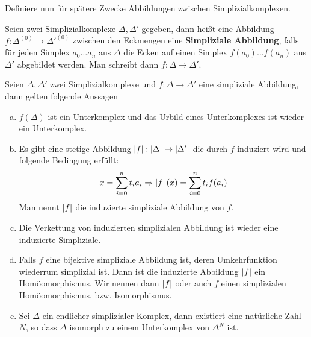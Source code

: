 Definiere nun für spätere Zwecke Abbildungen zwischen Simplizialkomplexen.

\begin{Def} 
  Seien zwei Simplizialkomplexe $\Delta, \Delta'$ gegeben, dann heißt
  eine Abbildung $f: \Delta^{(0)} \rightarrow \Delta'^{(0)}$ zwischen
  den Eckmengen eine \textbf{Simpliziale Abbildung}, falls für jeden
  Simplex $a_0 \ldots a_n$ aus $\Delta$ die Ecken auf einen Simplex
  $f(a_0) \ldots f(a_n)$ aus $\Delta'$ abgebildet werden. Man schreibt
  dann $f: \Delta \rightarrow \Delta'$.
\end{Def}


\begin{Satz} \label{satz:geomsimp}
  Seien $\Delta, \Delta'$ zwei Simplizialkomplexe und
  $f: \Delta \rightarrow \Delta'$ eine simpliziale Abbildung, dann
  gelten folgende Aussagen
	\begin{enumerate}[(a)]
        \item $f(\Delta)$ ist ein Unterkomplex und das Urbild eines
          Unterkomplexes ist wieder ein Unterkomplex.
        \item Es gibt eine stetige Abbildung
          $\left| f \right| : \left| \Delta \right| \rightarrow \left| \Delta' \right|$ die durch
          $f$ induziert wird und folgende Bedingung erfüllt:
          \begin{gather*}
            x = \sum\limits_{i=0}^{n} t_i a_i \Rightarrow \left| f \right|(x) = \sum\limits_{i=0}^{n}
            t_i f(a_i)
          \end{gather*}
          Man nennt $\left| f \right|$ die induzierte simpliziale Abbildung von
          $f$.
        \item Die Verkettung von induzierten simplizialen Abbildung
          ist wieder eine induzierte Simpliziale.
        \item Falls $f$ eine bijektive simpliziale Abbildung ist,
          deren Umkehrfunktion wiederrum simplizial ist. Dann ist die
          induzierte Abbildung $\left| f \right|$ ein Homöomorphismus. Wir
          nennen dann $\left| f \right|$ oder auch $f$ einen simplizialen
          Homöomorphismus, bzw. Isomorphismus.
        \item Sei $\Delta$ ein endlicher simplizialer Komplex, dann
          existiert eine natürliche Zahl $N$, so dass $\Delta$
          isomorph zu einem Unterkomplex von $\Delta^N$ ist.

\end{enumerate}
\end{Satz}
